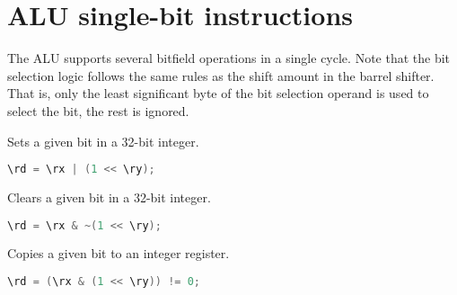 
\section{ALU single-bit instructions}


The \rvex{} ALU supports several bitfield operations in a single cycle. Note
that the bit selection logic follows the same rules as the shift amount in the
barrel shifter. That is, only the least significant byte of the bit selection
operand is used to select the bit, the rest is ignored.

Sets a given bit in a 32-bit integer.

\begin{lstlisting}[numbers=none, basicstyle=\ttfamily\footnotesize, language=C++]
\rd = \rx | (1 << \ry);
\end{lstlisting}

Clears a given bit in a 32-bit integer.

\begin{lstlisting}[numbers=none, basicstyle=\ttfamily\footnotesize, language=C++]
\rd = \rx & ~(1 << \ry);
\end{lstlisting}

Copies a given bit to an integer register.

\begin{lstlisting}[numbers=none, basicstyle=\ttfamily\footnotesize, language=C++]
\rd = (\rx & (1 << \ry)) != 0;
\end{lstlisting}

